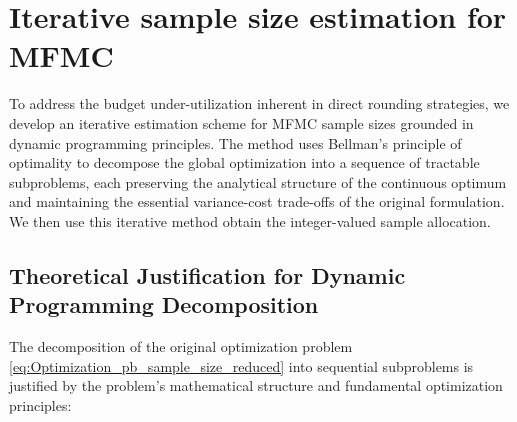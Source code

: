\section{Iterative sample size estimation for MFMC}\label{sec:Iterative_IntegerValued_Sample_Size}

To address the budget under-utilization inherent in direct rounding strategies, we develop an iterative estimation scheme for MFMC sample sizes grounded in dynamic programming principles. The method uses Bellman's principle of optimality \cite{Be:1957} to decompose the global optimization into a sequence of tractable subproblems, each preserving the analytical structure of the continuous optimum and maintaining the essential variance-cost trade-offs of the original formulation. We then use this iterative method obtain the integer-valued sample allocation.



\subsection{Theoretical Justification for Dynamic Programming Decomposition}

The decomposition of the original optimization problem \eqref{eq:Optimization_pb_sample_size_reduced} into sequential subproblems is justified by the problem's mathematical structure and fundamental optimization principles:


